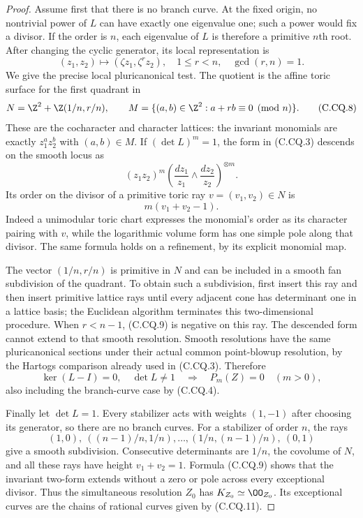 \begin{proof}
Assume first that there is no branch curve. At the
fixed origin, no nontrivial power of $L$ can have
exactly one eigenvalue one; such a power would fix
a divisor. If the order is $n$, each eigenvalue
of $L$ is therefore a primitive $n$th root.
After changing the cyclic generator, its local
representation is
\[
             (z_1,z_2)\longmapsto
                     (\zeta z_1,\zeta^r z_2),
       \quad 1\le r<n,\quad \gcd(r,n)=1 .
                                                               \tag{C.CQ.7}
\]
We give the precise local pluricanonical test. The
quotient is the affine toric surface for the first
quadrant in
\[
 N=\Z^2+\Z(1/n,r/n),\qquad
 M=\{(a,b)\in\Z^2:a+rb\equiv0\pmod n\}.
                                                               \tag{C.CQ.8}
\]
These are the cocharacter and character lattices:
the invariant monomials are exactly
$z_1^az_2^b$ with $(a,b)\in M$. If
$(\det L)^m=1$, the form in (C.CQ.3) descends on
the smooth locus as
\[
 (z_1z_2)^m
       \left(\frac{dz_1}{z_1}\wedge
             \frac{dz_2}{z_2}\right)^{\otimes m}.
\]
Its order on the divisor of a primitive toric ray
$v=(v_1,v_2)\in N$ is
\[
                       m(v_1+v_2-1).
                                                               \tag{C.CQ.9}
\]
Indeed a unimodular toric chart expresses the
monomial's order as its character pairing with $v$,
while the logarithmic volume form has one simple
pole along that divisor. The same formula holds
on a refinement, by its explicit monomial map.

The vector $(1/n,r/n)$ is primitive in $N$ and
can be included in a smooth fan subdivision of
the quadrant. To obtain such a subdivision, first
insert this ray and then insert primitive lattice
rays until every adjacent cone has determinant
one in a lattice basis; the Euclidean algorithm
terminates this two-dimensional procedure.
When $r<n-1$, (C.CQ.9) is negative on this ray.
The descended form cannot extend to that smooth
resolution. Smooth resolutions have the same
pluricanonical sections under their actual common
point-blowup resolution, by the Hartogs comparison
already used in (C.CQ.3). Therefore
\[
 \ker(L-I)=0,\quad \det L\ne1
      \quad\Longrightarrow\quad P_m(Z)=0\quad(m>0),
                                                               \tag{C.CQ.10}
\]
also including the branch-curve case by (C.CQ.4).

Finally let $\det L=1$. Every stabilizer acts with
weights $(1,-1)$ after choosing its generator, so
there are no branch curves. For a stabilizer of
order $n$, the rays
\[
 (1,0),\ ((n-1)/n,1/n),\ldots,
                 (1/n,(n-1)/n),\ (0,1)
                                                               \tag{C.CQ.11}
\]
give a smooth subdivision. Consecutive determinants
are $1/n$, the covolume of $N$, and all these rays
have height $v_1+v_2=1$. Formula (C.CQ.9) shows
that the invariant two-form extends without a
zero or pole across every exceptional divisor.
Thus the simultaneous resolution $Z_0$ has
$K_{Z_0}\simeq\OO_{Z_0}$. Its exceptional curves
are the chains of rational curves given by
(C.CQ.11).


\end{proof}
